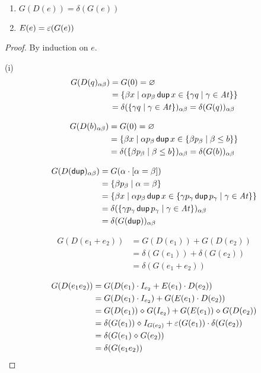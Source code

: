 \documentclass{article}
\newcommand\At{\ensuremath{\mathit{At}}}
\renewcommand\smash{\mathrel{\diamond}}
\newcommand\pdup{\mathop{\mathsf{dup}}}
\newcommand\bval[1]{[#1]}
\begin{document}
\section{}

\begin{lemma}\ 
\begin{enumerate}
\romanize
\item
$G(D(e)) = \delta(G(e))$
\item
$E(e) = \varepsilon(G(e))$
\end{enumerate}
\end{lemma}

\begin{proof}
By induction on $e$.

(i)
\begin{align*}
G(D(q)_{\alpha\beta})
&= G(0)
= \emptyset\\
&= \set{\beta x}{\alpha p_\beta\pdup x\in\set{\gamma q}{\gamma\in\At}}\\
&= \delta(\set{\gamma q}{\gamma\in\At})_{\alpha\beta}
= \delta(G(q))_{\alpha\beta}
\end{align*}

\begin{align*}
G(D(b)_{\alpha\beta})
&= G(0)
= \emptyset\\
&= \set{\beta x}{\alpha p_\beta\pdup x\in\set{\beta p_\beta}{\beta\leq b}}\\
&= \delta(\set{\beta p_\beta}{\beta\leq b})_{\alpha\beta}
= \delta(G(b))_{\alpha\beta}
\end{align*}

\begin{align*}
G(D(\pdup)_{\alpha\beta})
&= G(\alpha\cdot\bval{\alpha=\beta})\\
&= \set{\beta p_\beta}{\alpha=\beta}\\
&= \set{\beta x}{\alpha p_\beta\pdup x\in\set{\gamma p_\gamma\pdup p_\gamma}{\gamma\in\At}}\\
&= \delta(\set{\gamma p_\gamma\pdup p_\gamma}{\gamma\in\At})_{\alpha\beta}\\
&= \delta(G(\pdup))_{\alpha\beta}
\end{align*}

\begin{align*}
G(D(e_1+e_2))
&= G(D(e_1)) + G(D(e_2))\\
&= \delta(G(e_1)) + \delta(G(e_2))\\
&= \delta(G(e_1 + e_2))
\end{align*}

\begin{align*}
G(D(e_1e_2))
&= G(D(e_1)\cdot I_{e_2} + E(e_1)\cdot D(e_2))\\
&= G(D(e_1)\cdot I_{e_2}) + G(E(e_1)\cdot D(e_2))\\
&= G(D(e_1))\smash G(I_{e_2}) + G(E(e_1))\smash G(D(e_2))\\
&= \delta(G(e_1))\smash I_{G(e_2)} + \eps(G(e_1))\cdot\delta(G(e_2))\\
&= \delta(G(e_1)\smash G(e_2))\\
&= \delta(G(e_1e_2))
\end{align*}


\end{proof}
\end{document}
